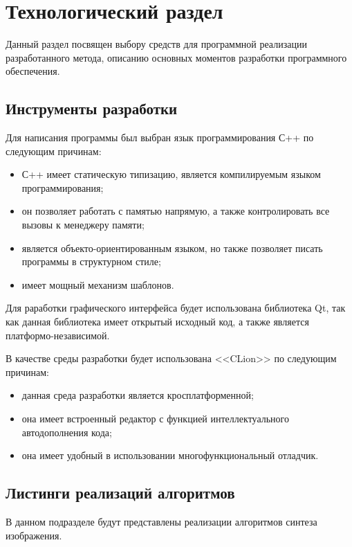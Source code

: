 \chapter{Технологический раздел}

Данный раздел посвящен выбору средств для программной реализации разработанного метода, описанию основных моментов разработки программного обеспечения.

\section{Инструменты разработки}

Для написания программы был выбран язык программирования С++\cite{c++} по следующим причинам:

\begin{itemize}
	\item С++ имеет статическую типизацию, является компилируемым языком программирования;
	\item он позволяет работать с памятью напрямую, а также контролировать все вызовы к менеджеру памяти;
	\item является объекто-ориентированным языком, но также позволяет писать программы в структурном стиле;
	\item имеет мощный механизм шаблонов.
\end{itemize}

Для раработки графического интерфейса будет использована библиотека Qt, так как данная библиотека имеет открытый исходный код, а также является платформо-независимой.

В качестве среды разработки будет использована <<CLion>>\cite{clion} по следующим причинам:

\begin{itemize}
	\item данная среда разработки является кросплатформенной;
	\item она имеет встроенный редактор с функцией интеллектуального автодополнения кода;
	\item она имеет удобный в использовании многофункциональный отладчик.
\end{itemize}

\section{Листинги реализаций алгоритмов}

В данном подразделе будут представлены реализации алгоритмов синтеза изображения.

